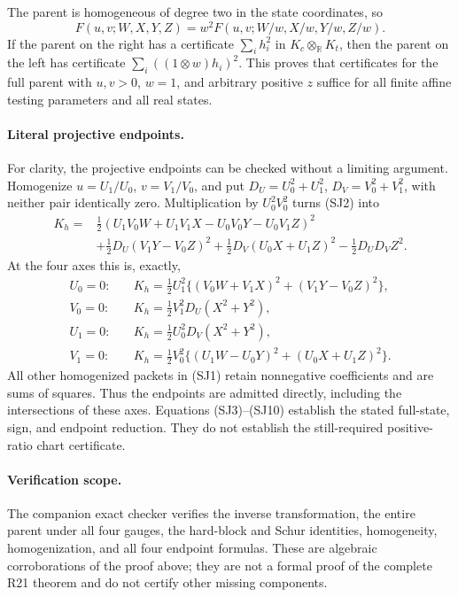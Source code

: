 The parent is homogeneous of degree two in the state coordinates, so
\[
 F(u,v;W,X,Y,Z)=w^2F(u,v;W/w,X/w,Y/w,Z/w).               \tag{SJ8}
\]
If the parent on the right has a certificate $\sum_i h_i^2$ in
$K_c\otimes_{\mathbb R}K_t$, then the parent on the left has certificate
$\sum_i((1\otimes w)h_i)^2$.  This proves that certificates for the full
parent with $u,v>0$, $w=1$, and arbitrary positive $z$ suffice for all
finite affine testing parameters and all real states.

\paragraph{Literal projective endpoints.}
For clarity, the projective endpoints can be checked without a limiting
argument.  Homogenize $u=U_1/U_0$, $v=V_1/V_0$, and put
$D_U=U_0^2+U_1^2$, $D_V=V_0^2+V_1^2$, with neither pair identically zero.
Multiplication by $U_0^2V_0^2$ turns (SJ2) into
\begin{align}
 K_h={}&\tfrac12(U_1V_0W+U_1V_1X-U_0V_0Y-U_0V_1Z)^2\\
       &+\tfrac12D_U(V_1Y-V_0Z)^2
        +\tfrac12D_V(U_0X+U_1Z)^2-\tfrac12D_UD_VZ^2.     \tag{SJ9}
\end{align}
At the four axes this is, exactly,
\begin{align}
 U_0=0:\quad &K_h=\tfrac12U_1^2\{(V_0W+V_1X)^2+(V_1Y-V_0Z)^2\},\\
 V_0=0:\quad &K_h=\tfrac12V_1^2D_U(X^2+Y^2),\\
 U_1=0:\quad &K_h=\tfrac12U_0^2D_V(X^2+Y^2),\\
 V_1=0:\quad &K_h=\tfrac12V_0^2\{(U_1W-U_0Y)^2+(U_0X+U_1Z)^2\}.
                                                               \tag{SJ10}
\end{align}
All other homogenized packets in (SJ1) retain nonnegative coefficients
and are sums of squares.  Thus the endpoints are admitted directly,
including the intersections of these axes.  Equations (SJ3)--(SJ10)
establish the stated full-state, sign, and endpoint reduction.  They do
not establish the still-required positive-ratio chart certificate.

\paragraph{Verification scope.}
The companion exact checker verifies the inverse transformation, the
entire parent under all four gauges, the hard-block and Schur identities,
homogeneity, homogenization, and all four endpoint formulas.  These are
algebraic corroborations of the proof above; they are not a formal proof
of the complete R21 theorem and do not certify other missing components.
